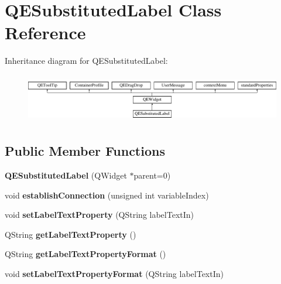 \hypertarget{classQESubstitutedLabel}{
\section{QESubstitutedLabel Class Reference}
\label{classQESubstitutedLabel}
}
Inheritance diagram for QESubstitutedLabel:\begin{figure}[H]
\begin{center}
\leavevmode
\includegraphics[height=2.153846cm]{classQESubstitutedLabel}
\end{center}
\end{figure}
\subsection*{Public Member Functions}
\begin{DoxyCompactItemize}
\item 
\hypertarget{classQESubstitutedLabel_a3b0d27881a68c1e98f2f2022fe526249}{
{\bfseries QESubstitutedLabel} (QWidget $\ast$parent=0)}
\label{classQESubstitutedLabel_a3b0d27881a68c1e98f2f2022fe526249}

\item 
\hypertarget{classQESubstitutedLabel_a55391ad0e824e2050cd9af0cec55b64c}{
void {\bfseries establishConnection} (unsigned int variableIndex)}
\label{classQESubstitutedLabel_a55391ad0e824e2050cd9af0cec55b64c}

\item 
\hypertarget{classQESubstitutedLabel_a9a85d0a1a0330fc71d240049444ae101}{
void {\bfseries setLabelTextProperty} (QString labelTextIn)}
\label{classQESubstitutedLabel_a9a85d0a1a0330fc71d240049444ae101}

\item 
\hypertarget{classQESubstitutedLabel_a862556afda9e7bcb162cd05a6af9934b}{
QString {\bfseries getLabelTextProperty} ()}
\label{classQESubstitutedLabel_a862556afda9e7bcb162cd05a6af9934b}

\item 
\hypertarget{classQESubstitutedLabel_a4860531d5242bb98e52190c8e182226a}{
QString {\bfseries getLabelTextPropertyFormat} ()}
\label{classQESubstitutedLabel_a4860531d5242bb98e52190c8e182226a}

\item 
\hypertarget{classQESubstitutedLabel_af64ba0ae76649a31e8b9521158850ef4}{
void {\bfseries setLabelTextPropertyFormat} (QString labelTextIn)}
\label{classQESubstitutedLabel_af64ba0ae76649a31e8b9521158850ef4}

\end{DoxyCompactItemize}
